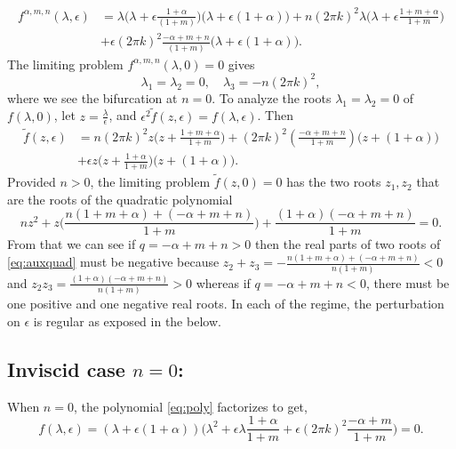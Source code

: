 \documentclass[a4paper,11pt]{article}
\theoremstyle{remark}
\begin{document}
\begin{align}
f^{\alpha,m,n}(\lambda,\epsilon)&= \lambda\Big(\lambda + \epsilon\frac{1+\alpha}{(1+m)}\Big)\Big(\lambda + \epsilon(1+\alpha)\Big) + n(2\pi k)^2\lambda\Big(\lambda + \epsilon\frac{1+m+\alpha}{1+m}\Big) \nonumber \\
&+ \epsilon(2\pi k)^2\frac{-\alpha+m+n}{(1+m)}\Big(\lambda + \epsilon(1+\alpha)\Big).
\end{align}
The limiting problem $f^{\alpha,m,n}(\lambda,0)=0$ gives 
$$ \lambda_1=\lambda_2=0, \quad \lambda_3 = -n(2\pi k)^2,$$
where we see the bifurcation at $n=0$. To analyze the roots $\lambda_1=\lambda_2=0$  of $f(\lambda,0)$, let $z = \frac{\lambda}{\epsilon}$, and $\epsilon^2\tilde{f}(z,\epsilon) =  f(\lambda, \epsilon)$. Then
\begin{align}
 \tilde{f}(z,\epsilon) &= n(2\pi k)^2 z\Big(z + \frac{1+m+\alpha}{1+m}\Big)+ (2\pi k)^2\left(\frac{-\alpha+m+n}{1+m}\right)\Big(z + (1+\alpha)\Big) \nonumber\\
 &+ \epsilon z\Big(z+\frac{1+\alpha}{1+m}\Big)\Big(z+(1+\alpha)\Big). \label{eq:reduced_poly}
\end{align}
Provided $n>0$, the limiting problem $\tilde{f}(z,0)=0$ has the two roots $z_1,z_2$ that are the roots of the quadratic polynomial
\begin{equation} 
nz^2 + z\Big( \frac{n(1+m+\alpha) + (-\alpha+m+n)}{1+m}\Big) + \frac{(1+\alpha)(-\alpha+m+n)}{1+m} =0. \label{eq:auxquad} 
\end{equation}
From that we can see if $q=-\alpha+m+n>0$ then the real parts of two roots of \eqref{eq:auxquad} must be negative because $z_2+z_3 = -\frac{n(1+m+\alpha) + (-\alpha+m+n)}{n(1+m)} < 0$ and $z_2z_3=\frac{(1+\alpha)(-\alpha+m+n)}{n(1+m)}>0$ whereas if $q=-\alpha+m+n<0$, there must be one positive and one negative real roots.
In each of the regime, the perturbation on $\epsilon$ is regular as exposed in the below.

\subsection{Inviscid case $n=0$:}
When $n=0$, the polynomial \eqref{eq:poly} factorizes to get,
$$ f(\lambda,\epsilon) = (\lambda +\epsilon(1+\alpha))\Big( \lambda^2 + \epsilon\lambda \frac{1+\alpha}{1+m} + \epsilon (2\pi k)^2 \frac{-\alpha+m}{1+m}\Big)=0.$$
\end{document}
